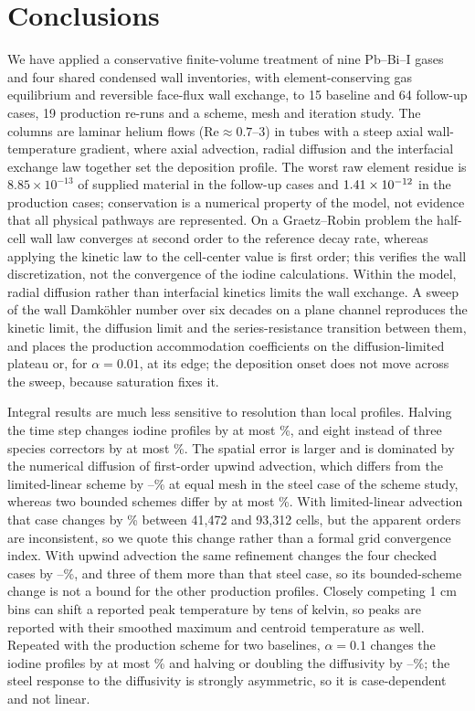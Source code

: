 \section{Conclusions}
\label{sec:conclusions}
We have applied a conservative finite-volume treatment of nine
Pb--Bi--I gases and four shared condensed wall inventories, with
element-conserving gas equilibrium and reversible face-flux wall
exchange, to 15 baseline and 64 follow-up cases, 19 production re-runs
and a scheme, mesh and iteration study. The columns are laminar helium
flows ($\mathrm{Re}\approx0.7$--3) in tubes with a steep axial
wall-temperature gradient, where axial advection, radial diffusion and
the interfacial exchange law together set the deposition profile. The
worst raw element residue is $8.85\times10^{-13}$ of supplied material
in the follow-up cases and $1.41\times10^{-12}$ in the production
cases; conservation is a numerical property of the model, not evidence
that all physical pathways are represented. On a Graetz--Robin problem
the half-cell wall law converges at second order to the reference decay
rate, whereas applying the kinetic law to the cell-center value is first
order; this verifies the wall discretization, not the convergence of
the iodine calculations. Within the model, radial diffusion rather than
interfacial kinetics limits the wall exchange. A sweep of the wall
Damk\"ohler number over six decades on a plane channel reproduces the
kinetic limit, the diffusion limit and the series-resistance transition
between them, and places the production accommodation coefficients on
the diffusion-limited plateau or, for $\alpha=0.01$, at its edge; the
deposition onset does not move across the sweep, because saturation
fixes it.

Integral results are much less sensitive to resolution than local
profiles. Halving the time step changes iodine profiles by at most
\TimeMax\%, and eight instead of three species correctors by at most
\IterSteelHigh\%. The spatial error is larger and is dominated by the
numerical diffusion of first-order upwind advection, which differs
from the limited-linear scheme by \UpLLFour--\UpLLOne\% at equal mesh in
the steel case of the scheme study, whereas two bounded schemes differ
by at most \VLSteelMax\%. With limited-linear advection that case
changes by \SteelLLThree\% between 41,472 and 93,312 cells, but the
apparent orders are inconsistent, so we quote this change rather than a
formal grid convergence index. With upwind advection the same
refinement changes the four checked cases by
\SteelUpThree--\UpFourOthersMax\%, and three of them more than that
steel case, so its bounded-scheme change is not a bound for the other
production profiles. Closely competing 1 cm bins can shift a reported
peak temperature by tens of kelvin, so peaks are reported with their
smoothed maximum and centroid temperature as well. Repeated with the
production scheme for two baselines, $\alpha=0.1$ changes the iodine
profiles by at most \PSAlphaOneMax\% and halving or doubling the
diffusivity by \PSDMin--\PSDMax\%; the steel response to the diffusivity
is strongly asymmetric, so it is case-dependent and not linear.

